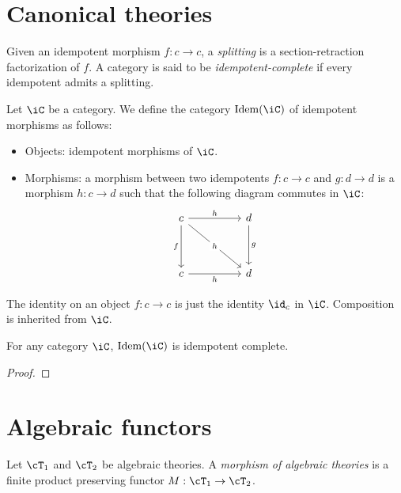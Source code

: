 \documentclass{zett}
\begin{document}
\section{Canonical theories}
\label{sec:canonical-theories}

\begin{defn}
  Given an idempotent morphism $f : c \to c$, a \emph{splitting} is a section-retraction factorization of $f$.
  A category is said to be \emph{idempotent-complete} if every idempotent admits a splitting.
\end{defn}

\begin{defn}
  Let $\iC$ be a category.
  We define the category $\Idem(\iC)$ of idempotent morphisms as follows:
  \begin{itemize}
  \item[] Objects: idempotent morphisms of $\iC$.
  \item[] Morphisms: a morphism between two idempotents $f : c \to c$ and $g : d \to d$ is a morphism $h : c \to d$ such that the following diagram commutes in $\iC$:
    \[\begin{tikzcd}
	c && d \\
	\\
	c && d
	\arrow["f"', from=1-1, to=3-1]
	\arrow["g", from=1-3, to=3-3]
	\arrow["h", from=1-1, to=1-3]
	\arrow["h"', from=3-1, to=3-3]
	\arrow["h"{description}, from=1-1, to=3-3]
      \end{tikzcd}\]
  \end{itemize}
  The identity on an object $f : c \to c$ is just the identity $\id_{c}$ in $\iC$.
  Composition is inherited from $\iC$.
\end{defn}

\begin{lem}
  For any category $\iC$, $\Idem(\iC)$ is idempotent complete.
\end{lem}
\begin{proof}
  
\end{proof}

\section{Algebraic functors}
\label{sec:algebraic-functors}

\begin{defn}
  Let $\cT_{1}$ and $\cT_{2}$ be algebraic theories.
  A \emph{morphism of algebraic theories} is a finite product preserving functor $M : \cT_{1} \to \cT_{2}$.
\end{defn}
\end{document}
